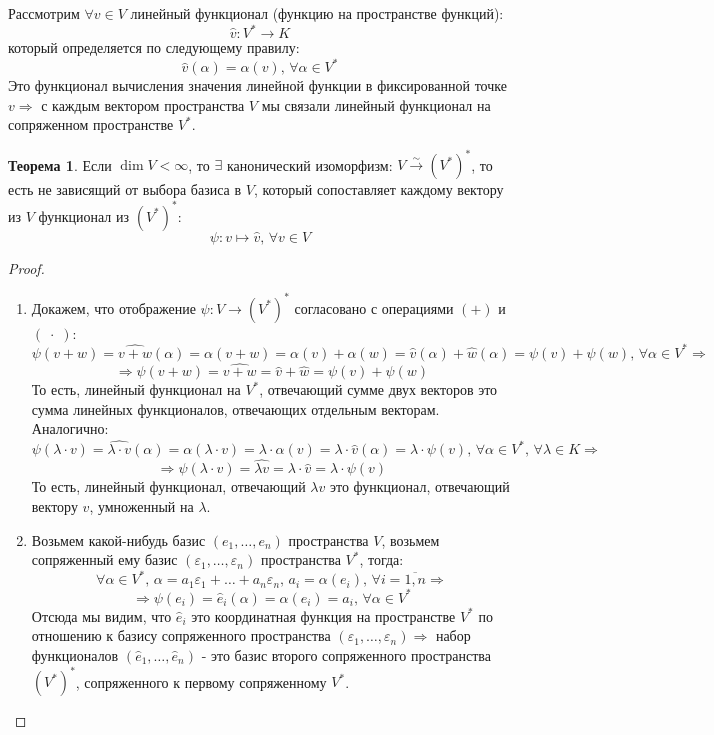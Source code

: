 \documentclass[12pt]{article}
\newcommand{\VE}{\varepsilon}
\theoremstyle{definition}
\newtheorem{theorem}{Теорема}
\newcommand{\wht}[1]{\widehat{#1}}
\begin{document}
Рассмотрим $\forall  v \in V$ линейный функционал (функцию на пространстве функций): 
$$
	\wht{v} \colon V^* \to K
$$ 
который определяется по следующему правилу:
$$
	\wht{v}(\alpha) = \alpha(v), \, \forall \alpha \in V^*
$$
Это функционал вычисления значения линейной функции в фиксированной точке $v \Rightarrow$ с каждым вектором пространства $V$ мы связали линейный функционал на сопряженном пространстве $V^*$. 

\begin{theorem}
	Если $\dim{V} < \infty$, то $\exists$ канонический изоморфизм: $V \xrightarrow[]{\sim}(V^*)^*$, то есть не зависящий от выбора базиса в $V$, который сопоставляет каждому вектору из $V$ функционал из $(V^*)^*$: 
	$$
		\psi \colon v \mapsto \wht{v},\, \forall v \in V
	$$
\end{theorem}
\begin{proof}\hfill
	\begin{enumerate}[label=\arabic*)]
		\item Докажем, что отображение $\psi \colon V \to (V^*)^*$ согласовано с операциями $(+)$ и $(\; {\cdot}\; )$:
		$$
			\psi(v+w) = \wht{v + w}(\alpha) = \alpha(v + w) = \alpha(v) + \alpha(w) = \wht{v}(\alpha) + \wht{w}(\alpha) = \psi(v) + \psi(w), \, \forall \alpha \in V^* \Rightarrow
		$$
		$$
			\Rightarrow \psi(v+w) = \wht{v + w} = \wht{v} + \wht{w} = \psi(v) + \psi(w)
		$$
		То есть, линейный функционал на $V^*$, отвечающий сумме двух векторов это сумма линейных функционалов, отвечающих отдельным векторам. Аналогично:
		$$
			\psi(\lambda{\cdot}v) = \wht{\lambda{\cdot}v}(\alpha) = \alpha(\lambda{\cdot} v) = \lambda {\cdot}\alpha(v) = \lambda {\cdot}\wht{v}(\alpha) = \lambda{\cdot}\psi(v) , \, \forall \alpha \in V^*, \, \forall \lambda \in K \Rightarrow 
		$$
		$$	
			\Rightarrow \psi(\lambda{\cdot}v) = \wht{\lambda v} = \lambda{\cdot}\wht{v} = \lambda{\cdot}\psi(v)
		$$
		То есть, линейный функционал, отвечающий $\lambda v$ это функционал, отвечающий вектору $v$, умноженный на $\lambda$. 
		
		\item Возьмем какой-нибудь базис $(e_1,\dotsc,e_n)$ пространства $V$, возьмем сопряженный ему базис $(\VE_1, \dotsc, \VE_n)$ пространства $V^*$, тогда:
		$$
			\forall \alpha \in V^*, \, \alpha = a_1\VE_1 + \dotsc + a_n \VE_n, \, a_i = \alpha(e_i), \, \forall i = \overline{1,n} \Rightarrow
		$$
		$$
			\Rightarrow \psi(e_i) = \wht{e}_i(\alpha) = \alpha(e_i) = a_i, \, \forall \alpha \in V^*
		$$
		Отсюда мы видим, что $\wht{e}_i$ это координатная функция на пространстве $V^*$ по отношению к базису сопряженного пространства $(\VE_1,\dotsc, \VE_n) \Rightarrow$ набор функционалов $\left(\wht{e}_1,\dotsc, \wht{e}_n\right)$ - это базис второго сопряженного пространства $(V^*)^*$, сопряженного к первому сопряженному $V^*$.
		

\end{enumerate}
\end{proof}
\end{document}
